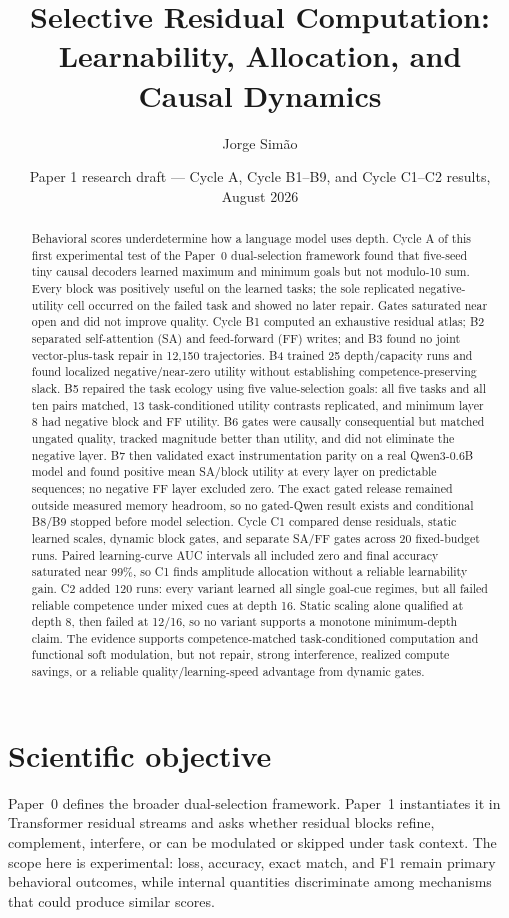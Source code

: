 \documentclass[10pt]{article}
\title{Selective Residual Computation:\\Learnability, Allocation, and Causal Dynamics}
\author{Jorge Sim\~ao}
\date{Paper 1 research draft --- Cycle A, Cycle B1--B9, and Cycle C1--C2 results, August 2026}
\begin{document}
\maketitle
\begin{abstract}
Behavioral scores underdetermine how a language model uses depth. Cycle A of this first experimental test of the Paper~0 dual-selection framework found that five-seed tiny causal decoders learned maximum and minimum goals but not modulo-10 sum. Every block was positively useful on the learned tasks; the sole replicated negative-utility cell occurred on the failed task and showed no later repair. Gates saturated near open and did not improve quality. Cycle B1 computed an exhaustive residual atlas; B2 separated self-attention (SA) and feed-forward (FF) writes; and B3 found no joint vector-plus-task repair in 12,150 trajectories. B4 trained 25 depth/capacity runs and found localized negative/near-zero utility without establishing competence-preserving slack. B5 repaired the task ecology using five value-selection goals: all five tasks and all ten pairs matched, 13 task-conditioned utility contrasts replicated, and minimum layer 8 had negative block and FF utility. B6 gates were causally consequential but matched ungated quality, tracked magnitude better than utility, and did not eliminate the negative layer. B7 then validated exact instrumentation parity on a real Qwen3-0.6B model and found positive mean SA/block utility at every layer on predictable sequences; no negative FF layer excluded zero. The exact gated release remained outside measured memory headroom, so no gated-Qwen result exists and conditional B8/B9 stopped before model selection. Cycle C1 compared dense residuals, static learned scales, dynamic block gates, and separate SA/FF gates across 20 fixed-budget runs. Paired learning-curve AUC intervals all included zero and final accuracy saturated near 99\%, so C1 finds amplitude allocation without a reliable learnability gain. C2 added 120 runs: every variant learned all single goal-cue regimes, but all failed reliable competence under mixed cues at depth 16. Static scaling alone qualified at depth 8, then failed at 12/16, so no variant supports a monotone minimum-depth claim. The evidence supports competence-matched task-conditioned computation and functional soft modulation, but not repair, strong interference, realized compute savings, or a reliable quality/learning-speed advantage from dynamic gates.
\end{abstract}

\section{Scientific objective}
Paper~0 defines the broader dual-selection framework. Paper~1 instantiates it in Transformer residual streams and asks whether residual blocks refine, complement, interfere, or can be modulated or skipped under task context. The scope here is experimental: loss, accuracy, exact match, and F1 remain primary behavioral outcomes, while internal quantities discriminate among mechanisms that could produce similar scores.
\end{document}
